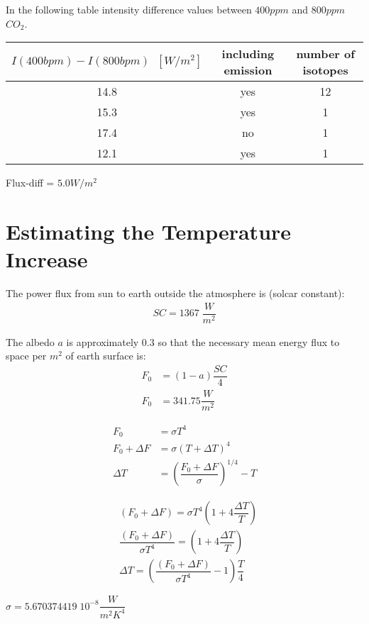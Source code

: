 In the following table intensity difference values between $400 ppm$ and $800 ppm$ $CO_2$. 
\newline
\newline
\begin{tabular}{|c |c |c |}
	\hline
	$I(400 bpm) - I(800 bpm) \;\; [W/m^2]$ & including emission & number of isotopes \\
	\hline
	14.8                                     & yes      &  12         \\
	15.3                                     & yes      &  1          \\
	17.4                                     & no       &  1          \\
	12.1                                     & yes      &  1       \\
	\hline   
\end{tabular}  

Flux-diff = $5.0 W/m^2$

\section{Estimating the Temperature Increase}


The power flux from sun to earth outside the atmosphere is (solcar constant):
\begin{align}
	SC = 1367 \; \dfrac{W}{m^2}
\end{align}

The albedo $a$ is approximately $0.3$ so that the necessary mean energy flux 
to space per $m^2$ of earth surface is:
\begin{align}
	F_0 &= (1-a) \dfrac{SC}{4} \\
	F_0 &=  341.75 \dfrac{W}{m^2}
\end{align}

\begin{align}
	F_0 &= \sigma T^4 \\
	F_0 + \Delta F &= \sigma (T+ \Delta T)^4 \\
	\Delta T &= \left(\dfrac{F_0+\Delta F}{\sigma}\right)^{1/4} - T
\end{align}

\begin{align}
	&(F_0 + \Delta F) = \sigma T^4 \left(1 + 4 \dfrac{\Delta T}{T}\right) \\
	&\dfrac{(F_0 + \Delta F)}{\sigma T^4} =\left(1 + 4 \dfrac{\Delta T}{T}\right) \\
	&\Delta T = \left(\dfrac{(F_0 + \Delta F)}{\sigma T^4} - 1\right) \dfrac{T}{4}
\end{align}

$\sigma = 5.670374419 \; 10^{-8} \dfrac{W}{ m^2  K^4}$
